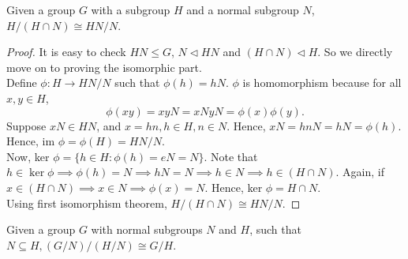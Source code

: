 \begin{theorem}
    Given a group $G$ with a subgroup $H$ and a normal subgroup $N$, $H/(H \cap N) \cong HN / N$.
\end{theorem}
\begin{proof}
    It is easy to check $HN \leq G$, $N \lhd HN$ and $(H \cap N) \lhd H$. So we directly move on to proving the isomorphic part.\\
    Define $\phi : H \rightarrow HN / N$ such that $\phi(h) = hN$. $\phi$ is homomorphism because for all $x, y \in H$,
        \[
        \phi(xy) = xy N = xN yN = \phi(x)\phi(y).
        \]
    Suppose $xN \in HN$, and $x = hn, h\in H, n \in N$. Hence, $xN = hnN = hN = \phi(h)$. Hence, im $\phi = \phi(H) = HN/N$.\\
    Now, ker $\phi = \{h \in H : \phi(h) = eN = N\}$. Note that $h \in \ker \phi \implies \phi(h) = N \implies hN = N \implies h \in N \implies h \in (H \cap N)$. Again, if $x \in (H \cap N) \implies x \in N \implies \phi(x) = N$. Hence, ker $\phi = H \cap N$.\\
    Using first isomorphism theorem, $H/(H \cap N) \cong HN / N$.
\end{proof}
\begin{theorem}
    Given a group $G$ with normal subgroups $N$ and $H$, such that $N \subseteq H, (G/N)/(H/N) \cong G/H$.
\end{theorem}
